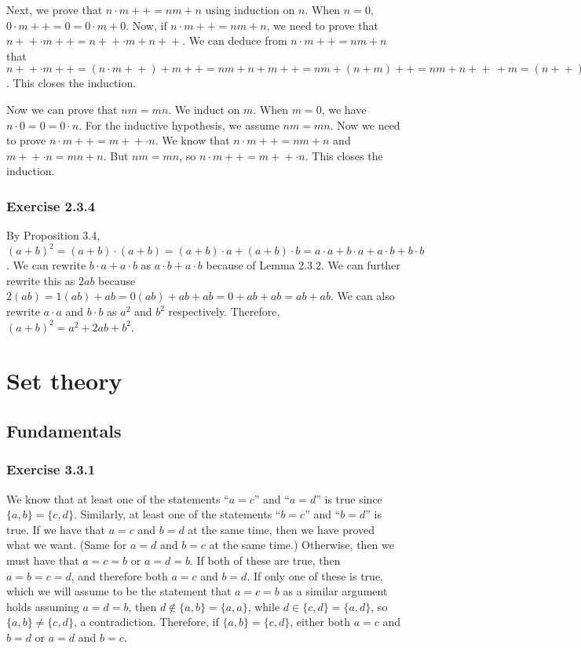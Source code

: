 \documentclass[12pt, oneside]{book}
\newcommand{\increment}{\! + \! +}
\begin{document}
	Next, we prove that $n \cdot m \increment = nm + n$ using induction on $n$. When $n = 0$, $0 \cdot m \increment = 0 = 0 \cdot m + 0$. Now, if $n \cdot m \increment = nm + n$, we need to prove that $n \increment \cdot m \increment = n \increment \cdot m + n \increment$. We can deduce from $n \cdot m \increment = nm + n$ that $n \increment \cdot m \increment = (n \cdot m \increment) + m \increment = nm + n + m \increment = nm + (n + m) \increment = nm + n \increment \, + m = (n \increment) \cdot m + n \increment$. This closes the induction.

	Now we can prove that $nm = mn$. We induct on $m$. When $m = 0$, we have $n \cdot 0 = 0 = 0 \cdot n$. For the inductive hypothesis, we assume $nm = mn$. Now we need to prove $n \cdot m \increment = m \increment \cdot n$. We know that $n \cdot m \increment = nm + n$ and $m \increment \cdot n = mn + n$. But $nm = mn$, so $n \cdot m \increment = m \increment \cdot n$. This closes the induction.

	\subsection*{Exercise 2.3.4}

	By Proposition 3.4, $(a + b)^2 = (a + b)  \cdot (a + b) = (a + b) \cdot a + (a + b) \cdot b = a \cdot a + b \cdot a + a \cdot b + b \cdot b$. We can rewrite $b \cdot a + a \cdot b$ as $a \cdot b + a \cdot b$ because of Lemma 2.3.2. We can further rewrite this as $2ab$ because $2(ab) = 1(ab) + ab = 0(ab) + ab + ab = 0 + ab + ab = ab + ab$. We can also rewrite $a \cdot a$ and $b \cdot b$ as $a^2$ and $b^2$ respectively. Therefore, $(a + b)^2 = a^2 + 2ab + b^2$.

	\chapter{Set theory}

	\section{Fundamentals}

	\subsection*{Exercise 3.3.1}

	We know that at least one of the statements ``$a = c$'' and ``$a = d$'' is true since $\{a, b\} = \{c, d\}$. Similarly, at least one of the statements ``$b = c$'' and ``$b = d$'' is true. If we have that $a = c$ and $b = d$ at the same time, then we have proved what we want. (Same for $a = d$ and $b = c$ at the same time.) Otherwise, then we must have that $a = c = b$ or $a = d = b$. If both of these are true, then $a = b = c = d$, and therefore both $a = c$ and $b = d$. If only one of these is true, which we will assume to be the statement that $a = c = b$ as a similar argument holds assuming $a = d = b$, then $d \notin \{a, b\} = \{a, a\}$, while $d \in \{c, d\} = \{a, d\}$, so $\{a, b\} \ne \{c, d\}$, a contradiction. Therefore, if $\{a, b\} = \{c, d\}$, either both $a = c$ and $b = d$ or $a = d$ and $b = c$.
\end{document}
